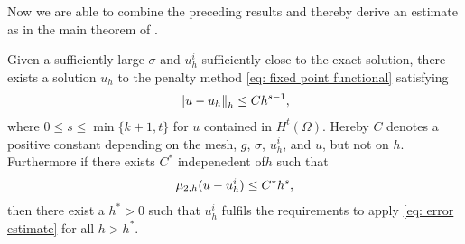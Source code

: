 
Now we are able to combine the preceding results and thereby derive an estimate as in the main theorem of \cite{BGN+2011}.
\begin{theorem}\label{main result}
	Given a sufficiently large $\sigma$ and $u_h^i$ sufficiently close to the exact solution, there exists a solution $u_h$ to the penalty method \eqref{eq: fixed point functional} satisfying
	\begin{align}
		\left\lVert u-u_h \right\rVert_{h} \leq C h^{s-1}, \label{eq: error estimate}
	\end{align}
	where $0 \leq s \leq \min\{k+1, t\}$ for $u$ contained in $H^t(\Omega)$. Hereby $C$ denotes a positive constant depending on the mesh, $g$, $\sigma$, $u^i_h$, and $u$, but not on $h$.\\
	Furthermore if there exists $C^*$ indepenedent of$h$ such that
	\begin{align}
		\mu_{2,h}(u-u_h^i) \leq C^* h^{s}, \label{eq: estimate error}
	\end{align}
	then there exist a $h^*> 0$ such that $u_h^i$ fulfils the requirements to apply \eqref{eq: error estimate} for all $h > h^*$.
	
\end{theorem}

